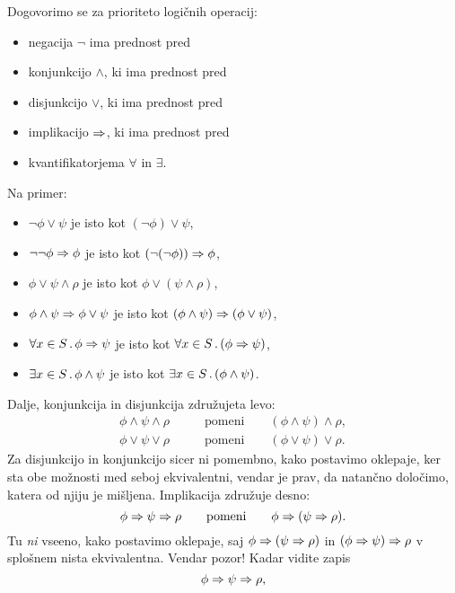 Dogovorimo se za prioriteto logičnih operacij:
%
\begin{itemize}
\item negacija $\lnot$ ima prednost pred
\item konjunkcijo $\land$, ki ima prednost pred
\item disjunkcijo $\lor$, ki ima prednost pred
\item implikacijo $\Rightarrow$, ki ima prednost pred
\item kvantifikatorjema $\forall$ in $\exists$.
\end{itemize}
%
Na primer:
%
\begin{itemize}
\item $\lnot \phi \lor \psi$ je isto kot $(\lnot \phi) \lor \psi$,
\item $\lnot \lnot \phi \Rightarrow \phi$ je isto kot $(\lnot(\lnot\phi))
  \Rightarrow \phi$,
\item $\phi \lor \psi \land \rho$ je isto kot $\phi \lor (\psi \land \rho)$,
\item $\phi \land \psi \Rightarrow \phi \lor \psi$ je isto kot $(\phi
  \land \psi) \Rightarrow (\phi \lor \psi)$,
\item $\forall x \in S \,.\, \phi \Rightarrow \psi$ je isto kot $\forall x \in S \,.\, (\phi
    \Rightarrow \psi)$,
\item $\exists x \in S \,.\, \phi \land \psi$ je isto kot $\exists x \in S \,.\, (\phi
    \land \psi)$.
\end{itemize}
%
Dalje, konjunkcija in disjunkcija združujeta levo:
% 
\begin{align*}
  \phi \land \psi \land \rho
  &\qquad\text{pomeni}\qquad
  (\phi \land \psi) \land \rho,\\
  \phi \lor \psi \lor \rho
  &\qquad\text{pomeni}\qquad
  (\phi \lor \psi) \lor \rho.
\end{align*}
%
Za disjunkcijo in konjunkcijo sicer ni pomembno, kako postavimo
oklepaje, ker sta obe možnosti med seboj ekvivalentni, vendar je prav,
da natančno določimo, katera od njiju je mišljena.
Implikacija združuje desno:
%
\begin{equation*}
  \phi \Rightarrow \psi \Rightarrow \rho
  \qquad\text{pomeni}\qquad
  \phi \Rightarrow (\psi \Rightarrow \rho).
\end{equation*}
%
Tu \emph{ni} vseeno, kako postavimo oklepaje, saj $\phi \Rightarrow (\psi
\Rightarrow \rho)$ in $(\phi \Rightarrow \psi) \Rightarrow \rho$ v splošnem nista
ekvivalentna. Vendar pozor! Kadar vidite zapis
%
\begin{equation*}
  \phi \Rightarrow \psi \Rightarrow \rho,
\end{equation*}
